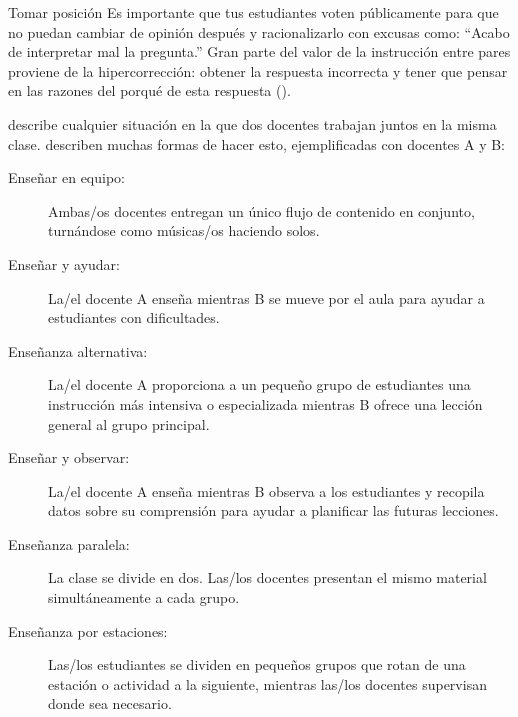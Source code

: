 \newpage
\begin{aside}{Tomar posición}
  Es importante que tus estudiantes voten públicamente
  para que no puedan cambiar de opinión después y racionalizarlo
  con excusas como: ``Acabo de interpretar mal la pregunta.''
  Gran parte del valor de la instrucción entre pares proviene de la hipercorrección:
  obtener la respuesta incorrecta
  y tener que pensar en las razones del porqué de esta respuesta
  ().
\end{aside}


 describe cualquier situación
en la que dos docentes trabajan juntos en la misma clase.
\cite{Frie2016} describen muchas formas de hacer esto, ejemplificadas con docentes A y B:

\begin{description}

\item[Enseñar en equipo:]
  Ambas/os docentes entregan un único flujo de contenido en conjunto,
  turnándose como músicas/os haciendo solos.

\item[Enseñar y ayudar:]
  La/el docente A enseña mientras B se mueve por el aula
  para ayudar a estudiantes con dificultades.

\item[Enseñanza alternativa:]
  La/el docente A proporciona a un pequeño grupo de estudiantes
  una instrucción más intensiva o especializada
  mientras B ofrece una lección general al grupo principal.
 
\item[Enseñar y observar:]
  La/el docente A enseña mientras B observa a los estudiantes
  y recopila datos sobre su comprensión para ayudar a planificar las futuras lecciones.

\item[Enseñanza paralela:]
  La clase se divide en dos. 
  Las/los docentes presentan el mismo material simultáneamente a cada grupo.

\item[Enseñanza por estaciones:]
  Las/los estudiantes se dividen en pequeños grupos
  que rotan de una estación o actividad a la siguiente,
  mientras las/los docentes supervisan donde sea necesario.

\end{description}

